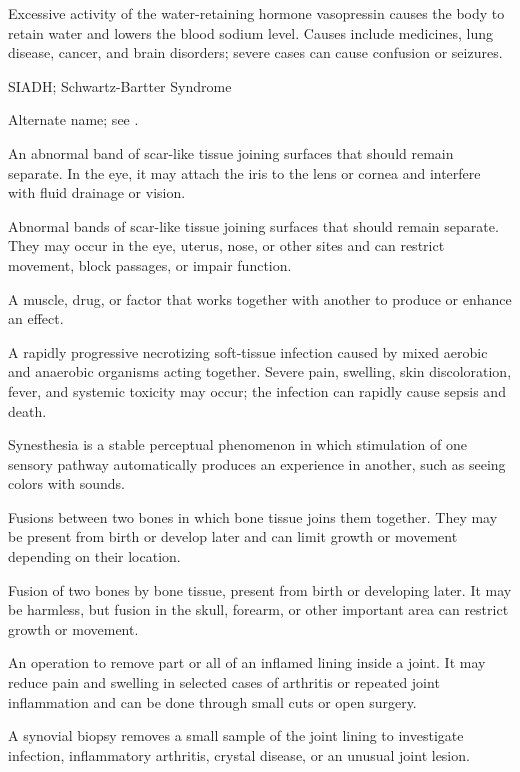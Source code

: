  Excessive activity of the water-retaining hormone vasopressin causes the body to retain water and lowers the blood sodium level. Causes include medicines, lung disease, cancer, and brain disorders; severe cases can cause confusion or seizures.

\synonyms
SIADH; Schwartz-Bartter Syndrome

 Alternate name; see .

 An abnormal band of scar-like tissue joining surfaces that should remain separate. In the eye, it may attach the iris to the lens or cornea and interfere with fluid drainage or vision.

 Abnormal bands of scar-like tissue joining surfaces that should remain separate. They may occur in the eye, uterus, nose, or other sites and can restrict movement, block passages, or impair function.

 A muscle, drug, or factor that works together with another to produce or enhance an effect.

 A rapidly progressive necrotizing soft-tissue infection caused by mixed aerobic and anaerobic organisms acting together. Severe pain, swelling, skin discoloration, fever, and systemic toxicity may occur; the infection can rapidly cause sepsis and death.

 Synesthesia is a stable perceptual phenomenon in which stimulation of one sensory pathway automatically produces an experience in another, such as seeing colors with sounds.

 Fusions between two bones in which bone tissue joins them together. They may be present from birth or develop later and can limit growth or movement depending on their location.

 Fusion of two bones by bone tissue, present from birth or developing later. It may be harmless, but fusion in the skull, forearm, or other important area can restrict growth or movement.

 An operation to remove part or all of an inflamed lining inside a joint. It may reduce pain and swelling in selected cases of arthritis or repeated joint inflammation and can be done through small cuts or open surgery.

 A synovial biopsy removes a small sample of the joint lining to investigate infection, inflammatory arthritis, crystal disease, or an unusual joint lesion.

